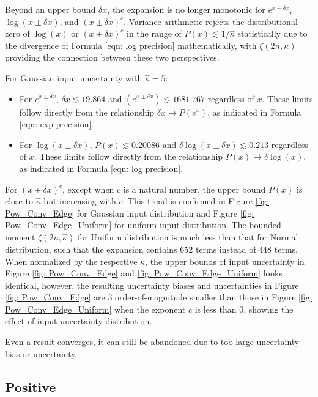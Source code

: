 \documentclass[twoside]{article}
\numberwithin{equation}{section}
\begin{document}
Beyond an upper bound $\delta x$, the expansion is no longer monotonic for $e^{x \pm \delta x}$, $\log(x \pm \delta x)$, and $(x \pm \delta x)^c$.
Variance arithmetic rejects the distributional zero of $\log(x)$ or $(x \pm \delta x)^c$ in the range of $P(x) \lesssim 1/\hat{\kappa}$ statistically due to the divergence of Formula \eqref{eqn: log precision} mathematically, with $\zeta(2n, \kappa)$ providing the connection between these two perspectives.

For Gaussian input uncertainty with $\hat{\kappa} = 5$:
\begin{itemize}
\item 
For $e^{x \pm \delta x}$, $\delta x \lesssim 19.864$ and $(e^{x \pm \delta x}) \lesssim 1681.767$ regardless of $x$.
These limits follow directly from the relationship $\delta x \rightarrow P(e^x)$, as indicated in Formula \eqref{eqn: exp precision}.

\item 
For $\log(x \pm \delta x)$, $P(x) \lesssim 0.20086$ and $\delta \log(x \pm \delta x) \lesssim 0.213$ regardless of $x$.
These limits follow directly from the relationship $P(x) \rightarrow \delta \log(x)$, as indicated in Formula \eqref{eqn: log precision}.
\end{itemize}
For $(x \pm \delta x)^c$, except when $c$ is a natural number, the upper bound $P(x)$ is close to $\hat{\kappa}$ but increasing with $c$. 
This trend is confirmed in Figure \ref{fig: Pow_Conv_Edge} for Gaussian input distribution and Figure \ref{fig: Pow_Conv_Edge_Uniform} for uniform input distribution.
The bounded moment $\zeta(2n, \hat{\kappa})$ for Uniform distribution is much less than that for Normal distribution, such that the expansion contains $652$ terms instead of $448$ terms.
When normalized by the respective $\kappa$, the upper bounds of input uncertainty in Figure \ref{fig: Pow_Conv_Edge} and \ref{fig: Pow_Conv_Edge_Uniform} looks identical, however, the resulting uncertainty biases and uncertainties in Figure \ref{fig: Pow_Conv_Edge} are $3$ order-of-magnitude smaller than those in Figure \ref{fig: Pow_Conv_Edge_Uniform} when the exponent $c$ is less than $0$, showing the effect of input uncertainty distribution.

Even a result converges, it can still be abandoned due to too large uncertainty bias or uncertainty.




\subsection{Positive}
\end{document}
